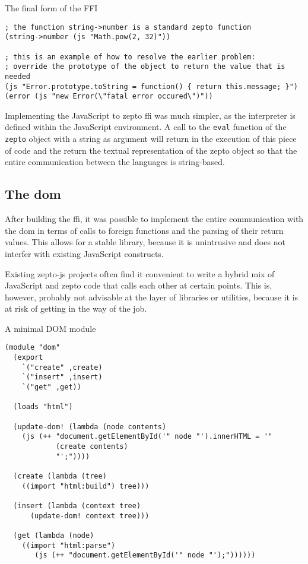 \documentclass[oneside,11pt,xetex]{scrbook}
\begin{document}
\begin{listing}[H]
\caption{The final form of the FFI}
\begin{verbatim}
; the function string->number is a standard zepto function
(string->number (js "Math.pow(2, 32)"))

; this is an example of how to resolve the earlier problem:
; override the prototype of the object to return the value that is needed
(js "Error.prototype.toString = function() { return this.message; }")
(error (js "new Error(\"fatal error occured\")"))
\end{verbatim}
\end{listing}

Implementing the JavaScript to zepto \gls{ffi} was much simpler, as the
interpreter is defined within the JavaScript environment. A call to the
\texttt{eval} function of the \texttt{zepto} object with a string as argument
will return in the execution of this piece of code and the return the textual
representation of the zepto object so that the entire communication between
the languages is string-based.

\subsection{The \gls{dom}}

After building the \gls{ffi}, it was possible to implement the entire
communication with the \gls{dom} in terms of calls to foreign functions
and the parsing of their return values. This allows for a stable library,
because it is unintrusive and does not interfer with existing JavaScript
constructs.

Existing zepto-js projects often find it convenient to write a hybrid mix
of JavaScript and zepto code that calls each other at certain points.
This is, however, probably not advisable at the layer of libraries or
utilities, because it is at risk of getting in the way of the job.

\begin{listing}[H]
\caption{A minimal DOM module}
\begin{verbatim}
(module "dom"
  (export
    `("create" ,create)
    `("insert" ,insert)
    `("get" ,get))

  (loads "html")

  (update-dom! (lambda (node contents)
    (js (++ "document.getElementById('" node "').innerHTML = '"
            (create contents)
            "';"))))

  (create (lambda (tree)
    ((import "html:build") tree)))

  (insert (lambda (context tree)
      (update-dom! context tree)))

  (get (lambda (node)
    ((import "html:parse")
       (js (++ "document.getElementById('" node "');"))))))
\end{verbatim}
\end{listing}
\end{document}
